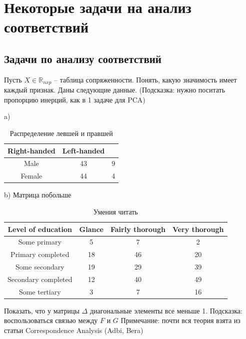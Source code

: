 \section{Некоторые задачи на анализ соответствий}
\subsection{Задачи по анализу соответствий}
\problem Пусть $X\in\mathbb{R}_{nxp}$ -- таблица сопряженности. Понять, какую значимость имеет каждый признак. Даны следующие данные.
(Подсказка: нужно поситать пропорцию инерций, как в 1 задаче для PCA)

a) \begin{table}[H]\centering
\begin{tabular}{ccc}
\toprule
Right-handed & Left-handed  \\
\midrule Male & 43 & 9 \\
Female & 44 & 4  \\
\bottomrule
\end{tabular}
\caption{Распределение левшей и правшей}
\end{table}

b) Матрица побольше \begin{table}[H]
\centering
\begin{tabular}{cccc}
\toprule
Level of education  &  Glance & Fairly thorough & Very thorough\\
\midrule  
  Some primary      &    5    &    7  & 2\\
  Primary completed   &  18    &    46 & 20\\
  Some secondary  &  19        & 29  & 39\\
  Secondary completed & 12    &  40  &   49\\
  Some tertiary &  3 &    7 &  16\\
\bottomrule
\end{tabular}
\caption{Умения читать}
\end{table}
\problem Показать, что у матрицы $\Delta$ диагональные элементы все меньше 1.
Подсказка: воспользоваться связью между $F$ и $G$
Примечание: почти вся теория взята из статьи Correspondence Analysis (Adbi, Bera)
